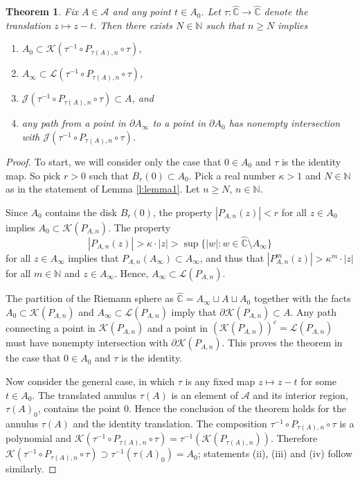 \documentclass[a4paper,11pt,onecolumn]{amsart}
\newtheorem{theorem}{Theorem}[section]
\theoremstyle{definition}
\begin{document}
\begin{theorem} \label{t:JuliaFitInAnnulus}
Fix $A \in \mathcal{A}$ and any point $t \in A_0$.  Let $\tau:\hat{\mathbb{C}} \rightarrow \hat{\mathbb{C}}$ denote the translation $z \mapsto z - t$.   Then there exists $N \in \mathbb{N}$ such that $n \geq N$ implies

\begin{enumerate}
\item $A_0 \subset \mathcal{K}(\tau^{-1} \circ P_{\tau(A),n} \circ \tau)$, 
\item $A_{\infty} \subset \mathcal{L}(\tau^{-1} \circ P_{\tau(A),n} \circ \tau)$,
\item $\mathcal{J}(\tau^{-1} \circ P_{\tau(A),n} \circ \tau ) \subset A$, and 
\item any path from a point in $\partial A_{\infty}$ to a point in $\partial A_0$ has nonempty intersection with $\mathcal{J}(\tau^{-1} \circ P_{\tau(A),n} \circ \tau)$. 
\end{enumerate}
\end{theorem}

\begin{proof}
To start, we will consider only the case that $0 \in A_0$ and $\tau$ is the identity map.   So pick $r>0$ such that $B_r(0) \subset A_0$.  Pick a real number $\kappa >1$ and $N \in \mathbb{N}$ as in the statement of Lemma \ref{l:lemma1}.  Let $n \geq N$, $n \in \mathbb{N}$.  

Since $A_0$ contains the disk $B_r(0)$, the property  $|P_{A,n}(z)| < r$ for all $ z \in A_0$ implies $A_0 \subset \mathcal{K}(P_{A,n})$.  The property $$|P_{A,n}(z)| >  \kappa \cdot |z| >  \sup \{|w| : w \in \hat{\mathbb{C}} \setminus A_{\infty} \}$$  for all  $z \in A_{\infty}$ implies that $P_{A,n}(A_{\infty}) \subset A_{\infty}$, and thus that $|P_{A,n}^{m}(z)| > \kappa^m \cdot |z|$ for all $m \in \mathbb{N}$ and $z \in A_{\infty}$.  Hence, $A_{\infty} \subset \mathcal{L}(P_{A,n})$.  

The partition of the Riemann sphere as $\hat{\mathbb{C}} = A_{\infty} \sqcup A \sqcup A_0$ together with the facts $A_0 \subset \mathcal{K}(P_{A,n})$ and  $A_{\infty} \subset \mathcal{L}(P_{A,n})$ imply that $\partial \mathcal{K}(P_{A,n}) \subset A$.  Any path connecting a point in $\mathcal{K}(P_{A,n})$ and a point in $(\mathcal{K}(P_{A,n}))^c = \mathcal{L}(P_{A,n})$ must have nonempty intersection with $\partial \mathcal{K}(P_{A,n})$.  This proves the theorem in the case that $0 \in A_0$ and $\tau$ is the identity.    

Now consider the general case, in which $\tau$ is any fixed map $z \mapsto z-t$ for some $t \in A_0$.  The translated annulus $\tau(A)$ is an element of $\mathcal{A}$ and its interior region, $\tau(A)_0$, contains the point $0$.  Hence the conclusion of the theorem holds for the annulus $\tau(A)$ and the identity translation.  The composition $\tau^{-1}\circ P_{\tau(A),n} \circ \tau$ is a polynomial and $\mathcal{K}(\tau^{-1}\circ P_{\tau(A),n} \circ \tau) = \tau^{-1}(\mathcal{K}(P_{\tau(A),n}))$.   Therefore $\mathcal{K}(\tau^{-1} \circ P_{\tau(A),n} \circ \tau) \supset \tau^{-1}(\tau(A)_0) = A_0$; statements (ii), (iii) and (iv) follow similarly. 

\end{proof}
\end{document}
